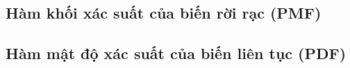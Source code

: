 \par
\subsection{Hàm khối xác suất của biến rời rạc (PMF)}\label{subsec:1.2.1}
\par
\subsection{Hàm mật độ xác suất của biến liên tục (PDF)}\label{subsec:1.2.2}


